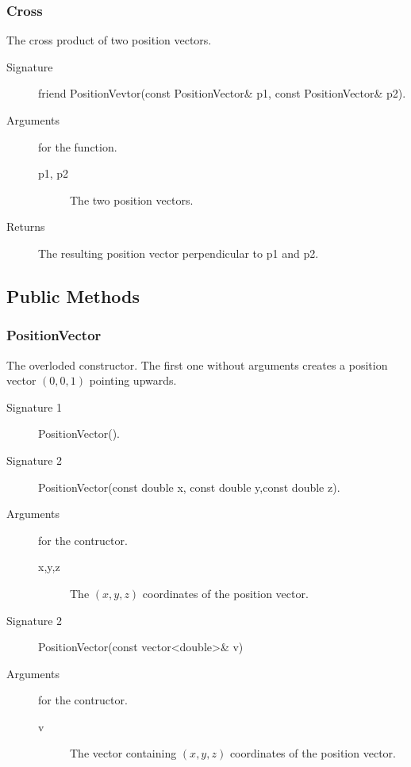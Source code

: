 \subsubsection{Cross}
The cross product of two position vectors.
\begin{description}
  \item[Signature] friend PositionVevtor(const PositionVector\& p1, const
  PositionVector\& p2).
  \item[Arguments] for the function.
    \begin{description}
      \item[p1, p2] The two position vectors.
    \end{description}
  \item[Returns] The resulting position vector perpendicular to p1 and
  p2.
\end{description}

\subsection{Public Methods}
\subsubsection{PositionVector}
The overloded constructor. The first one without arguments creates a
position vector $(0,0,1)$ pointing upwards.  
\begin{description}
   \item[Signature 1] PositionVector().    
   \item[Signature 2] PositionVector(const double x, const double
   y,const double z).
   \item[Arguments] for the contructor.
      \begin{description}        
         \item[x,y,z] The $(x,y,z)$ coordinates of the position
   vector.
      \end{description}    
   \item[Signature 2] PositionVector(const vector<double>\& v)
   \item[Arguments] for the contructor.
       \begin{description}
         \item[v] The vector containing $(x,y,z)$ coordinates of the
   position vector.
         \end{description}    
\end{description} 

